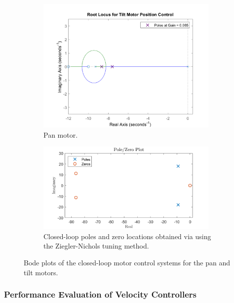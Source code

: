 \documentclass[../../main.tex]{subfiles}
\begin{document}
\begin{figure}[h]
\begin{subfigure}{0.48\textwidth}
    \includegraphics[width = 0.97\textwidth]{Sections/System_Design/Images/RL_TiltMotorVelPolePlace.png}
    \caption{Pan motor.}
    \label{fig:vel_root_locus}
\end{subfigure}\quad
\begin{subfigure}{0.48\textwidth}
    \includegraphics[width = 0.97\textwidth]{Sections/System_Design/Images/PoleZero_TiltMotorVel_NZ.png}
    \caption{Closed-loop poles and zero locations obtained via using the Ziegler-Nichols tuning method.}
    \label{fig:ZN_pole_zero}
\end{subfigure}
\caption{Bode plots of the closed-loop motor control systems for the pan and tilt motors.}
\label{fig:vel_poles_zeros}
\end{figure}

\subsubsection*{Performance Evaluation of Velocity Controllers}
\end{document}
